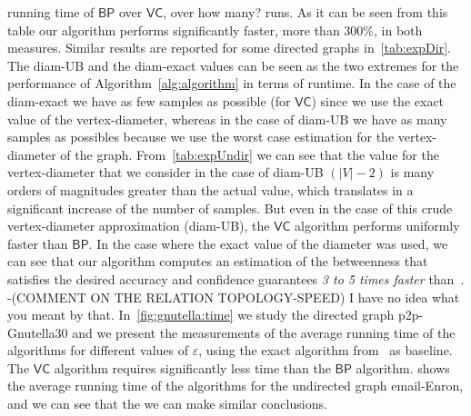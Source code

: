 running time of $\mathsf{BP}$ over $\mathsf{VC}$, over \XXX how many? runs. As
it can be seen from this table our algorithm performs significantly faster, more
than 300\%, in both measures. Similar results are reported for some directed
graphs in~\cref{tab:expDir}.
The diam-UB
and the diam-exact values can be seen as the two extremes for the performance of 
Algorithm~\ref{alg:algorithm} in terms of runtime. In the case of the diam-exact
we have as few samples as possible (for $\mathsf{VC}$) since we use the exact
value of the vertex-diameter, whereas in the case of diam-UB we have as many
samples as possibles because we use the worst case estimation for the
vertex-diameter of the graph.  %
From~\cref{tab:expUndir} we can see that the value for the
vertex-diameter that we consider in the case of diam-UB $(|V|-2)$ is many orders of
magnitudes greater than the actual value, which translates in a significant
increase of the number of samples. But even in the case of this crude
vertex-diameter approximation (diam-UB), the $\mathsf{VC}$ algorithm performs uniformly faster than
$\mathsf{BP}$. In the case where the exact value of the diameter was used, we
can see that our algorithm computes an estimation of the betweenness that
satisfies the desired accuracy and confidence guarantees \emph{3 to 5 times
faster} than~\citep{BrandesP07}. \XXX-(COMMENT ON THE RELATION TOPOLOGY-SPEED)
\MR I have no idea what you meant by that. In~\cref{fig:gnutella:time} we study
the directed graph p2p-Gnutella30 and we present the measurements of
the average running time of the algorithms for different values of
$\varepsilon$, using the exact algorithm from~\citep{Brandes01} as baseline. The
$\mathsf{VC}$ algorithm requires significantly less time than the $\mathsf{BP}$
algorithm.  shows the average running time of the
algorithms for the undirected graph email-Enron, and we can see that the
we can make similar conclusions.
